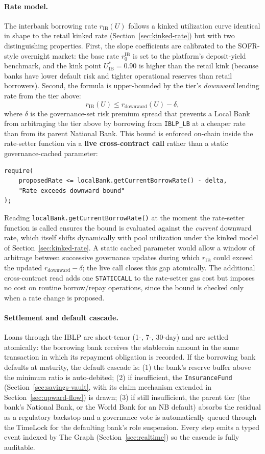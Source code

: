 \documentclass[12pt,a4paper]{report}
\begin{document}
\paragraph{Rate model.}
The interbank borrowing rate $r_{\text{IB}}(U)$ follows a kinked utilization curve identical in shape to the retail kinked rate (Section~\ref{sec:kinked-rate}) but with two distinguishing properties. First, the slope coefficients are calibrated to the SOFR-style overnight market: the base rate $r_0^{\text{IB}}$ is set to the platform's deposit-yield benchmark, and the kink point $U^{*}_{\text{IB}} = 0.90$ is higher than the retail kink (because banks have lower default risk and tighter operational reserves than retail borrowers). Second, the formula is upper-bounded by the tier's \emph{downward} lending rate from the tier above:
\[
r_{\text{IB}}(U) \le r_{\text{downward}}(U) - \delta,
\]
where $\delta$ is the governance-set risk premium spread that prevents a Local Bank from arbitraging the tier above by borrowing from \texttt{IBLP\_LB} at a cheaper rate than from its parent National Bank. This bound is enforced on-chain inside the rate-setter function via a \textbf{live cross-contract call} rather than a static governance-cached parameter:
\begin{verbatim}
require(
    proposedRate <= localBank.getCurrentBorrowRate() - delta,
    "Rate exceeds downward bound"
);
\end{verbatim}
Reading \texttt{localBank.getCurrentBorrowRate()} at the moment the rate-setter function is called ensures the bound is evaluated against the \emph{current} downward rate, which itself shifts dynamically with pool utilization under the kinked model of Section~\ref{sec:kinked-rate}.  A static cached parameter would allow a window of arbitrage between successive governance updates during which $r_{\text{IB}}$ could exceed the updated $r_{\text{downward}} - \delta$; the live call closes this gap atomically.  The additional cross-contract read adds one \texttt{STATICCALL} to the rate-setter gas cost but imposes no cost on routine borrow/repay operations, since the bound is checked only when a rate change is proposed.

\paragraph{Settlement and default cascade.}
Loans through the IBLP are short-tenor (1-, 7-, 30-day) and are settled atomically: the borrowing bank receives the stablecoin amount in the same transaction in which its repayment obligation is recorded. If the borrowing bank defaults at maturity, the default cascade is: (1) the bank's reserve buffer above the minimum ratio is auto-debited; (2) if insufficient, the \texttt{InsuranceFund} (Section~\ref{sec:savings-vault}, with its claim mechanism extended in Section~\ref{sec:upward-flow}) is drawn; (3) if still insufficient, the parent tier (the bank's National Bank, or the World Bank for an NB default) absorbs the residual as a regulatory backstop and a governance vote is automatically queued through the TimeLock for the defaulting bank's role suspension. Every step emits a typed event indexed by The Graph (Section~\ref{sec:realtime}) so the cascade is fully auditable.
\end{document}
